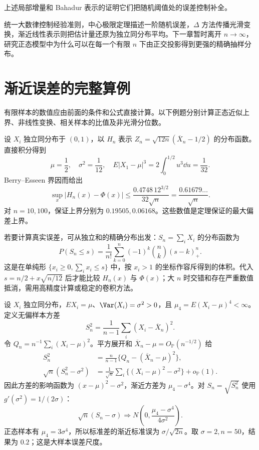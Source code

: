 上述局部增量和 Bahadur 表示的证明它们把随机阈值处的误差控制补全。

统一大数律控制经验准则，中心极限定理描述一阶随机误差，$\Delta$ 方法传播光滑变换，渐近线性表示则把估计量还原为独立同分布平均。下一章暂时离开 $n\to\infty$，研究正态模型中为什么可以在每一个有限 $n$ 下由正交投影得到更强的精确抽样分布。

\section{渐近误差的完整算例}\label{sec:clt-examples}

有限样本的数值应由前面的条件和公式直接计算。以下例题分别计算正态近似上界、非线性变换、相关样本的比值及非光滑分位数。

\begin{exbox}[均匀分布的正态近似上界]
设 $X_i$ 独立同分布于 $(0,1)$，以 $H_n$ 表示 $Z_n=\sqrt{12n}(\overline X_n-1/2)$ 的分布函数。直接积分得到
\[
 \mu=\frac12,\quad \sigma^2=\frac1{12},\quad
 E|X_1-\mu|^3=2\int_0^{1/2}u^3\dd u=\frac1{32}.
\]
Berry--Esseen 界因而给出
\[
 \sup_x|H_n(x)-\Phi(x)|
 \le\frac{0.4748\,12^{3/2}}{32\sqrt n}
 =\frac{0.61679\ldots}{\sqrt n}.
\]
对 $n=10,100$，保证上界分别为 $0.19505,0.06168$。这些数值是定理保证的最大偏差上界。

若要计算真实误差，可从独立和的精确分布出发：$S_n=\sum_iX_i$ 的分布函数为
\[
 P(S_n\le s)=\frac1{n!}\sum_{k=0}^n(-1)^k\binom nk(s-k)_+^n.
\]
这是在单纯形 $\{x_i\ge0,\sum_ix_i\le s\}$ 中，按 $x_i>1$ 的坐标作容斥得到的体积。代入 $s=n/2+x\sqrt{n/12}$ 后才能比较 $H_n(x)$ 与 $\Phi(x)$；大 $n$ 时交错和存在严重数值抵消，需用高精度计算或稳定的卷积方法。
\end{exbox}

\begin{exbox}[样本方差与标准差的影响函数]
设 $X_i$ 独立同分布，$EX_i=\mu$、$\Var(X_i)=\sigma^2>0$，且 $\mu_4=E(X_i-\mu)^4<\infty$。定义无偏样本方差
\[
 S_n^2=\frac1{n-1}\sum_i(X_i-\overline X_n)^2.
\]
令 $Q_n=n^{-1}\sum_i(X_i-\mu)^2$。平方展开和 $\overline X_n-\mu=O_{\mathbb P}(n^{-1/2})$ 给
\begin{align*}
 S_n^2&=\frac n{n-1}\{Q_n-(\overline X_n-\mu)^2\},\\
 \sqrt n(S_n^2-\sigma^2)
 &=\frac1{\sqrt n}\sum_i\{(X_i-\mu)^2-\sigma^2\}+o_{\mathbb P}(1).
\end{align*}
因此方差的影响函数为 $(x-\mu)^2-\sigma^2$，渐近方差为 $\mu_4-\sigma^4$。对 $S_n=\sqrt{S_n^2}$ 使用 $g'(\sigma^2)=1/(2\sigma)$：
\[
 \sqrt n(S_n-\sigma)\Rightarrow
 N\!\left(0,\frac{\mu_4-\sigma^4}{4\sigma^2}\right).
\]
正态样本有 $\mu_4=3\sigma^4$，所以标准差的渐近标准误为 $\sigma/\sqrt{2n}$。取 $\sigma=2,n=50$，结果为 $0.2$；这是大样本误差尺度。
\end{exbox}

